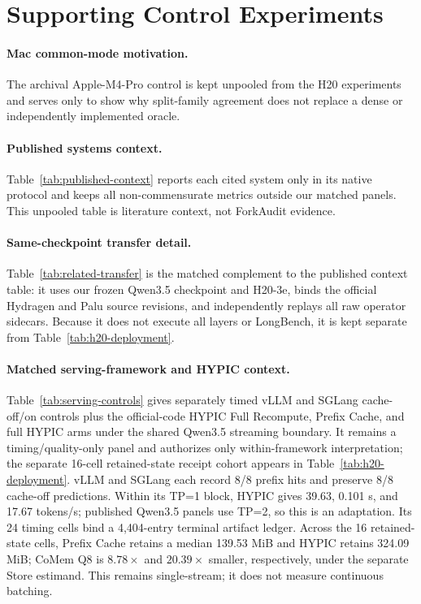 \documentclass{article}
\begin{document}
\section{Supporting Control Experiments}
\label{app:controls}

\paragraph{Mac common-mode motivation.}
The archival Apple-M4-Pro control is kept unpooled from the H20 experiments and
serves only to show why split-family agreement does not replace a dense or
independently implemented oracle.


\paragraph{Published systems context.}
Table~\ref{tab:published-context} reports each cited system only in its native
protocol and keeps all non-commensurate metrics outside our matched panels.
This unpooled table is literature context, not ForkAudit evidence.


\paragraph{Same-checkpoint transfer detail.}
Table~\ref{tab:related-transfer} is the matched complement to the published
context table: it uses our frozen Qwen3.5 checkpoint and H20-3e, binds the
official Hydragen and Palu source revisions, and independently replays all raw
operator sidecars.  Because it does not execute all layers or LongBench, it is
kept separate from Table~\ref{tab:h20-deployment}.


\paragraph{Matched serving-framework and HYPIC context.}
Table~\ref{tab:serving-controls} gives separately timed vLLM and SGLang
cache-off/on controls plus the official-code HYPIC Full Recompute, Prefix
Cache, and full HYPIC arms under the shared Qwen3.5 streaming boundary.  It
remains a timing/quality-only panel and authorizes only within-framework
interpretation; the separate 16-cell retained-state receipt cohort appears in
Table~\ref{tab:h20-deployment}.
vLLM and SGLang each record 8/8 prefix hits and preserve 8/8 cache-off
predictions.  Within its TP=1 block, HYPIC gives 39.63, 0.101 s, and 17.67
tokens/s; published Qwen3.5 panels use TP=2, so this is an adaptation.  Its 24
timing cells bind a 4,404-entry terminal artifact ledger.  Across the
16 retained-state cells, Prefix Cache retains a median 139.53 MiB and HYPIC
retains 324.09 MiB; CoMem Q8 is $8.78\times$ and $20.39\times$ smaller,
respectively, under the separate Store estimand.  This remains single-stream;
it does not measure continuous batching.

\end{document}
